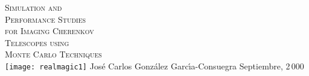 %



\def\mititulo{%
Simulation and \\%
Performance Studies\\%
for Imaging Cherenkov Telescopes\\%
using Monte Carlo Techniques\\}

\def\mititulogrande{%
Simulation and \\%
Performance Studies\\%
for Imaging Cherenkov\\%
Telescopes using\\%
Monte Carlo Techniques\\}

\def\yo{Jos{\'{e}} Carlos Gonz{\'{a}}lez Garc{\'{\i}}a-Consuegra}


\thispagestyle{empty}  

\mbox{} \vskip 30pt

\begin{center}
  {\fontsize{30}{35}\selectfont \scshape \mititulogrande}
  \vskip 50pt
  {\centering \texttt{[image: realmagic1]}}
  \vskip 50pt
  {\huge \yo}
  \vskip 50pt
  {\LARGE Septiembre, 2\,000 \\} 
\end{center}

\echapter %

